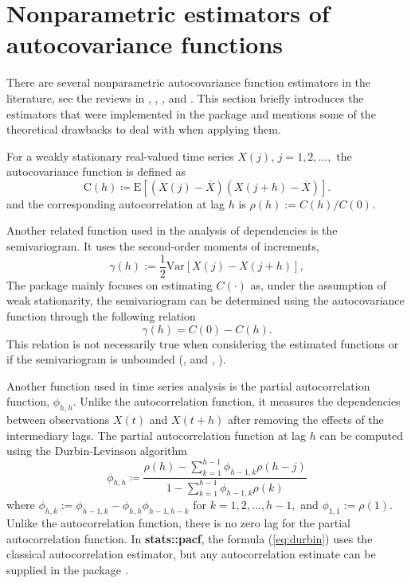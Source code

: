 \section{Nonparametric estimators of autocovariance
functions}\label{sec:nonparametric}

There are several nonparametric autocovariance function estimators in
the literature, see the reviews in \citet[Chapter~2.4]{Cressie1993},
\citet{hall1994_2}, \citet{cuevas2013study}, \citet{Durre2015} and
\citet{Bilchouris_Olenko_2025}. This section briefly introduces the
estimators that were implemented in the package and mentions some of the
theoretical drawbacks to deal with when applying them.

For a weakly stationary real-valued time series \(X(j)\),
\(j = 1, 2, \dots ,\) the autocovariance function is defined as
\[\text{C}(h) \coloneq \text{E}\left[\left(X(j) - \overline{X}\right)\left(X(j + h) - \overline{X}\right)\right].\]
and the corresponding autocorrelation at lag \(h\) is
\(\rho(h):=C(h)/C(0).\)

Another related function used in the analysis of dependencies is the
semivariogram. It uses the second-order moments of increments,
\[\gamma(h) := \frac{1}{2} \text{Var}\left[X(j) - X(j + h) \right]  ,\]
The package  mainly focuses on estimating \(C(\cdot)\)
as, under the assumption of weak stationarity, the semivariogram can be
determined using the autocovariance function through the following
relation \begin{equation}
 \label{eqn:variogram}
    \gamma(h) = C(0) - C(h).
\end{equation} This relation is not necessarily true when considering
the estimated functions or if the semivariogram is unbounded
(\citeauthor{Chils2012}, \citeyear{Chils2012} and
\citeauthor{Bilchouris_Olenko_2025}, \citeyear{Bilchouris_Olenko_2025}).

Another function used in time series analysis is the partial
autocorrelation function, \(\phi_{h,h}.\) Unlike the autocorrelation
function, it measures the dependencies between observations \(X(t)\) and
\(X(t+h)\) after removing the effects of the intermediary lags. The
partial autocorrelation function at lag \(h\) can be computed using the
Durbin-Levinson algorithm \citep{Durbin1960} \begin{equation}
 \label{eq:durbin}
    \phi_{h, h} \coloneq \frac{\rho(h) - \sum_{k=1}^{h-1} \phi_{h - 1, k} \rho(h - j)}{1 - \sum_{k=1}^{h-1} \phi_{h - 1, k} \rho(k)}
\end{equation} where
\(\phi_{h, k} := \phi_{h - 1, k} - \phi_{h, h} \phi_{h - 1, h - k}\) for
\(k = 1, 2, \dots, h - 1,\) and \(\phi_{1, 1} := \rho(1)\). Unlike the
autocorrelation function, there is no zero lag for the partial
autocorrelation function. In \textbf{stats::pacf}, the formula
(\ref{eq:durbin}) uses the classical autocorrelation estimator, but any
autocorrelation estimate can be supplied in the package
.

